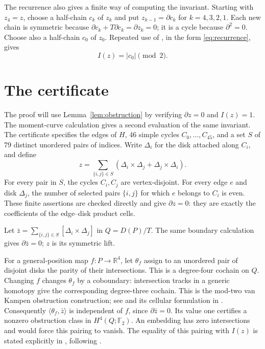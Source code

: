 \documentclass[11pt]{article}
\newcommand{\F}{\mathbb F_2}
\newcommand{\R}{\mathbb R}
\begin{document}
The recurrence also gives a finite way of computing the invariant.
Starting with $z_4=z$, choose a half-chain $c_k$ of $z_k$ and put
$z_{k-1}=\partial c_k$ for $k=4,3,2,1$.
Each new chain is symmetric because
$\partial c_k+T\partial c_k=\partial z_k=0$;
it is a cycle because $\partial^2=0$.
Choose also a half-chain $c_0$ of $z_0$.
Repeated use of \cite[Lemma 12]{vdHP}, in the form
\eqref{eq:recurrence}, gives
\begin{equation}\label{eq:base}
I(z)=|c_0|\pmod2.
\end{equation}


\section{The certificate}\label{sec:certificate}
The proof will use Lemma~\ref{lem:obstruction} by verifying
$\partial z=0$ and $I(z)=1$. The moment-curve calculation gives a second
evaluation of the same invariant.
The certificate specifies the edges of $H$, 46 simple cycles
$C_0,\ldots,C_{45}$, and a set $S$ of 79 distinct unordered pairs of
indices. Write $\Delta_i$ for the disk attached along $C_i$, and define
\[
z=\sum_{\{i,j\}\in S}
(\Delta_i\times \Delta_j+\Delta_j\times \Delta_i).
\]
For every pair in $S$, the cycles $C_i,C_j$ are vertex-disjoint.
For every edge $e$ and disk $\Delta_j$, the number of selected pairs
$\{i,j\}$ for which $e$ belongs to $C_i$ is even.
These finite assertions are checked directly and give $\partial z=0$:
they are exactly the coefficients of the edge--disk product cells.

Let $\bar z=\sum_{\{i,j\}\in S}[\Delta_i\times \Delta_j]$ in
$Q=D(P)/T$. The same boundary calculation gives $\partial\bar z=0$;
$z$ is its symmetric lift.

For a general-position map $f:P\to\R^4$, let $\theta_f$ assign to
an unordered pair of disjoint disks the parity of their intersections.
This is a degree-four cochain on $Q$. Changing $f$ changes
$\theta_f$ by a coboundary: intersection tracks in a generic homotopy
give the corresponding degree-three cochain. This is the mod-two
van Kampen obstruction construction; see \cite[Appendix D]{MTW} and
its cellular formulation in \cite[Appendix B.1]{KT}. Consequently
$\langle\theta_f,\bar z\rangle$ is independent of $f$, since
$\partial\bar z=0$. Its value one certifies a nonzero obstruction
class in $H^4(Q;\F)$. An embedding has zero intersections and would
force this pairing to vanish. The equality of this pairing with $I(z)$
is stated explicitly in \cite[Appendix B.1, p.\ 26]{KT}, following
\cite{vdHP}.
\end{document}
